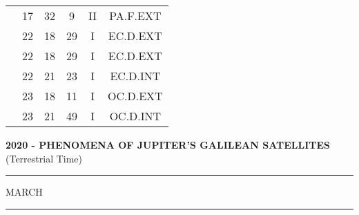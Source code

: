 \documentclass[12pt, a4paper]{article}
\begin{document}
\begin{multicols}{3}
{\begin{tabular}{c c c c c c}
	 	 	 	 & 17 & 32 & 9 & II & PA.F.EXT\\%
	 	 	 	 & 22 & 18 & 29 & I & EC.D.EXT\\%
	 	 	 	 & 22 & 18 & 29 & I & EC.D.EXT\\%
	 	 	 	 & 22 & 21 & 23 & I & EC.D.INT\\%
	 	 	 	 & 23 & 18 & 11 & I & OC.D.EXT\\%
	 	 	 	 & 23 & 21 & 49 & I & OC.D.INT\\%
	 	 \end{tabular}
 	}
\end{multicols}
\textbf{2020 - PHENOMENA OF JUPITER'S GALILEAN SATELLITES}\\(Terrestrial Time) 
\vspace{0.1cm} \hrule \vspace{0.1cm}
MARCH\vspace{0.1cm}
\hrule
\vspace{-0.2cm}
\end{document}
